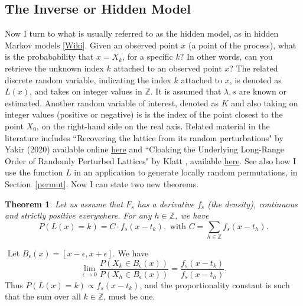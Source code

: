 \documentclass[10pt]{article}
\newtheorem{theorem}{Theorem}[section]
\newenvironment{proof}[1][Proof]{\begin{trivlist}
\item[\hskip \labelsep {\bfseries #1}]}{\end{trivlist}}
\newcommand{\qed}{\nobreak \ifvmode \relax \else
      \ifdim\lastskip<1.5em \hskip-\lastskip
      \hskip1.5em plus0em minus0.5em \fi \nobreak
      \vrule height0.75em width0.5em depth0.25em\fi}
\begin{document}
\subsection{The Inverse or Hidden Model}\label{hm}

Now I turn to what is usually referred to as the \textcolor{index}{hidden model},  as in hidden Markov models [\href{https://en.wikipedia.org/wiki/Hidden_Markov_model}{Wiki}]. Given an observed point $x$ (a point of the process), what is the probabability that $x=X_k$, for a specific $k$? In other words, can you retrieve the unknown \textcolor{index}{index} $k$ attached to an observed point $x$? The related discrete random variable, indicating the \textcolor{index}{index} $k$ attached to $x$, is denoted as $L(x)$, and takes on integer values in $\mathbb{Z}$. It is assumed that $\lambda,s$ are known or estimated. Another random variable of interest, denoted as $K$ and also taking on integer values (positive or negative) is is the index of the point closest to the point $X_0$, on the right-hand side on the real axis. Related material in the
literature includes ``Recovering the lattice from its random perturbations" by Yakir \cite{oren} (2020) available online
\href{https://arxiv.org/abs/2002.01508v2}{here} and
``Cloaking the Underlying Long-Range Order of Randomly Perturbed Lattices" by Klatt \cite{glattip}, available
 \href{https://arxiv.org/abs/2001.08161}{here}. See also how I use the function $L$ in an application to generate locally random permutations, in Section~\ref{permut}. Now I can state two new theorems.

\begin{theorem}
\label{sums4}
Let us assume that $F_s$ has a derivative $f_s$ (the density), continuous and strictly positive everywhere. For any $h\in\mathbb{Z}$, we have
$$
P(L(x)=k) =C\cdot f_s(x-t_k), \mbox{ with } C=\sum_{h\in\mathbb{Z}} f_s(x-t_h).$$
 \end{theorem}
\begin{proof}
$ $ \newline
Let $B_\epsilon(x)=[x-\epsilon,x+\epsilon]$. We have
\begin{equation}
\lim_{\epsilon\rightarrow 0}\frac{P(X_k\in B_\epsilon(x))}{P(X_h\in B_\epsilon(x))} = \frac{f_s(x-t_k)}{f_s(x-t_h)}.\nonumber
\end{equation}
Thus $P(L(x)=k)\propto  f_s(x-t_k)$, and the proportionality constant is such that the sum over all $k\in\mathbb{Z}$, must be one.
\qed
\end{proof}
\end{document}
